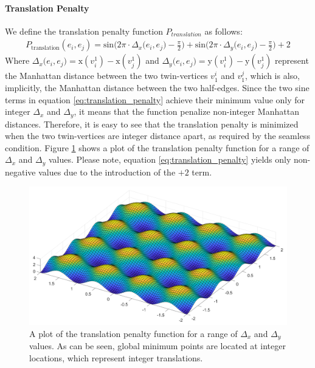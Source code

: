 \paragraph{Translation Penalty}
We define the translation penalty function $P_{translation}$ as follows:
\begin{equation}\label{eq:translation_penalty}
\begin{split}
P_{\mathrm{translation}}\left(e_i,e_j\right) = \mathrm{sin} \Big( 2\pi\cdot\Delta_x\big(e_i,e_j\big) - \frac{\pi}{2}\Big) + \mathrm{sin} \Big( 2\pi\cdot\Delta_y\big(e_i,e_j\big) - \frac{\pi}{2}\Big) + 2
\end{split}
\end{equation}
Where $\Delta_x\big(e_i,e_j\big) = \mathrm{x}\left(v_i^1\right) - \mathrm{x}\left(v_j^1\right)$ and $\Delta_y\big(e_i,e_j\big) = \mathrm{y}\left(v_i^1\right) - \mathrm{y}\left(v_j^1\right)$ represent the Manhattan distance between the two twin-vertices $v^i_1$ and $v^j_1$, which is also, implicitly, the Manhattan distance between the two half-edges. Since the two sine terms in equation \ref{eq:translation_penalty} achieve their minimum value only for integer $\Delta_x$ and $\Delta_y$, it means that the function penalize non-integer Manhattan distances. Therefore, it is easy to see that the translation penalty is minimized when the two twin-vertices are integer distance apart, as required by the seamless condition. Figure \ref{fig:translation_penalty} shows a plot of the translation penalty function for a range of $\Delta_x$ and $\Delta_y$ values. Please note, equation \ref{eq:translation_penalty} yields only non-negative values due to the introduction of the $+2$ term.
\begin{figure}[ht]
\centering
\includegraphics[width=15cm]{figures/seamless/translation_penalty_function.png}
\caption[The Translation Penalty Function]{A plot of the translation penalty function for a range of $\Delta_x$ and $\Delta_y$ values. As can be seen, global minimum points are located at integer locations, which represent integer translations.}
\label{fig:translation_penalty}
\end{figure}
